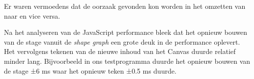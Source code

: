 
Er waren vermoedens dat de oorzaak gevonden kon worden in het omzetten van  naar  en vice versa.

Na het analyseren van de JavaScript performance bleek dat het opnieuw bouwen van de stage vanuit de \emph{shape graph} een grote deuk in de performance oplevert. Het vervolgens tekenen van de nieuwe inhoud van het Canvas duurde relatief minder lang. Bijvoorbeeld in ons testprogramma duurde het opnieuw bouwen van de stage ±6 ms waar het opnieuw teken ±0.5 ms duurde.

